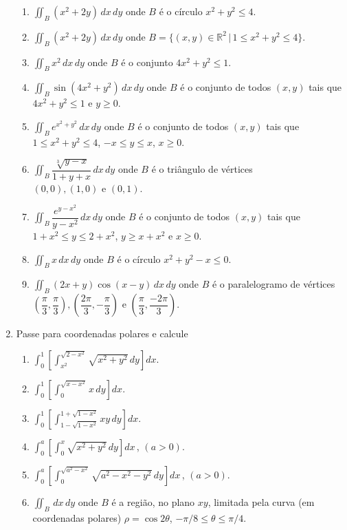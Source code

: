 \documentclass[11pt,a4paper]{article}
\newcommand{\integral}{\displaystyle\int}
\begin{document}
\begin{enumerate}
		\begin{enumerate}
		\item $\displaystyle\iint_B (x^2 + 2y) \,dx\,dy$ onde $B$ é o círculo $x^2 + y^2 \leq 4$.
		\item $\displaystyle\iint_B (x^2 + 2y) \,dx\,dy$ onde $B = \{(x,y) \in \mathbb{R}^2 \,|\, 1 \leq x^2 + y^2 \leq 4\}$.
		\item $\displaystyle\iint_B x^2 \,dx\,dy$ onde $B$ é o conjunto $4x^2 + y^2 \leq 1$.
		\item $\displaystyle\iint_B \sin (4x^2 + y^2) \,dx\,dy$ onde $B$ é o conjunto de todos $(x,y) $ tais que $4x^2 + y^2 \leq 1$ e $y \geq 0$.
		\item $\displaystyle\iint_B e^{x^2 + y^2} \,dx\,dy$ onde $B$ é o conjunto de todos $(x,y)$ tais que $1 \leq x^2 + y^2 \leq 4$, $-x \leq y \leq x$, $x \geq 0$.
		\item $\displaystyle\iint_B \dfrac{\sqrt[3]{y-x}}{1+y+x} \,dx\,dy$ onde $B$ é o triângulo de vértices $(0,0),(1,0) \textrm{ e } (0,1)$.
		\item $\displaystyle\iint_B \dfrac{e^{y-x^2}}{y-x^2} \,dx\,dy$ onde $B$ é o conjunto de todos $(x,y)$ tais que $1+x^2 \leq y \leq 2+x^2$, $y \geq x+x^2$ e $x \geq 0$.
		\item $\displaystyle\iint_B x \,dx\,dy$ onde $B$ é o círculo $x^2 + y^2 - x \leq 0$.
		\item $\displaystyle\iint_B (2x+y) \cos (x-y) \,dx\,dy$ onde $B$ é o paralelogramo de vértices $\left(\displaystyle\dfrac{\pi}{3},\displaystyle\dfrac{\pi}{3}\right),\left(\displaystyle\dfrac{2\pi}{3},-\displaystyle\dfrac{\pi}{3}\right) \textrm{ e } \left(\displaystyle\dfrac{\pi}{3},\displaystyle\dfrac{-2\pi}{3}\right)$.
		 
		\end{enumerate}		
		
		\item Passe para coordenadas polares e calcule
		
		\begin{enumerate}
		
		\item $\integral_0^{1} \left[ \integral_{x^2}^{\sqrt{2-x^2}} \sqrt{x^2 + y^2} \, dy \right] dx$.
		\item $\integral_0^{1} \left[ \integral_{0}^{\sqrt{x-x^2}} x \, dy \right] dx$.
		\item $\integral_0^{1} \left[ \integral_{1 - \sqrt{1-x^2}}^{1 + \sqrt{1-x^2}} xy \, dy \right] dx$.
		\item $\integral_0^{a} \left[ \integral_{0}^{x} \sqrt{x^2 + y^2} \, dy \right] dx \,$, $(a > 0)$.
		\item $\integral_0^{a} \left[ \integral_{0}^{\sqrt{a^2 - x^2}}  \sqrt{a^2 - x^2 - y^2}\, dy \right] dx \,$, $(a > 0)$.
		\item $\displaystyle\iint_B \,dx\,dy$ onde $B$ é a região, no plano $xy$, limitada pela curva (em coordenadas polares) $\rho = \cos 2\theta$, $-\pi/8 \leq \theta \leq \pi/4$.
\end{enumerate}			


\end{enumerate}
\end{document}

